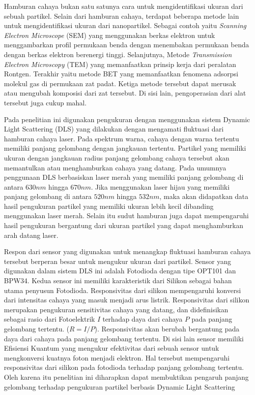 Hamburan cahaya bukan satu satunya cara untuk mengidentifikasi ukuran dari sebuah partikel. Selain
dari hamburan cahaya, terdapat beberapa metode lain untuk mengidentifikasi ukuran dari nanopartikel.
Sebagai contoh yaitu \textit{Scanning Electron Microscope} (SEM) yang menggunakan berkas elektron
untuk menggambarkan profil permukaan benda dengan menembakan permukaan benda dengan berkas elektron
berenergi tinggi. Selanjutnya, Metode \textit{Transmission Electron Microscopy} (TEM) yang
memanfaatkan prinsip kerja dari peralatan Rontgen. Terakhir yaitu metode BET yang memanfaatkan
fenomena adsorpsi molekul gas di permukaan zat padat. Ketiga metode tersebut dapat merusak atau
mengubah komposisi dari zat tersebut. Di sisi lain, pengoperasian dari alat tersebut juga cukup
mahal.

Pada penelitian ini digunakan pengukuran dengan menggunakan sistem Dynamic Light Scattering (DLS)
yang dilakukan dengan mengamati fluktuasi dari hamburan cahaya laser. Pada spektrum warna, cahaya
dengan warna tertentu memiliki panjang gelombang dengan jangkauan tertentu. Partikel yang memiliki
ukuran dengan jangkauan radius panjang gelombang cahaya tersebut akan memantulkan atau menghamburkan
cahaya yang datang. Pada umumnya penggunaan DLS berbasiskan laser merah yang memiliki panjang
gelombang di antara ${630 nm}$ hingga ${670 nm}$. Jika menggunakan laser hijau yang memiliki panjang
gelombang di antara ${520 nm}$ hingga ${532 nm}$, maka akan didapatkan data hasil pengukuran
partikel yang memiliki ukuran lebih kecil dibanding menggunakan laser merah\cite{Black1996}. Selain
itu sudut hamburan juga dapat mempengaruhi hasil pengukuran bergantung dari ukuran partikel yang
dapat menghamburkan arah datang laser\cite{DeVos2021}.

Respon dari sensor yang digunakan untuk menangkap fluktuasi hamburan cahaya tersebut berperan besar
untuk mengukur ukuran dari partikel. Sensor yang digunakan dalam sistem DLS ini adalah Fotodioda
dengan tipe OPT101 dan BPW34. Kedua sensor ini memiliki karakteristik dari Silikon sebagai bahan
utama penyusun Fotodioda. Responsivitas dari silikon mempengaruhi konversi dari intensitas cahaya
yang masuk menjadi arus listrik. Responsivitas dari silikon merupakan pengukuran sensitivitas cahaya
yang datang, dan didefinisikan sebagai rasio dari Fotoelektrik ${I}$ terhadap daya dari cahaya
${P}$ pada panjang gelombang tertentu. (${R = I/P}$). Responsivitas akan berubah bergantung pada
daya dari cahaya pada panjang gelombang tertentu. Di sisi lain sensor memiliki Efisiensi Kuantum
yang mengukur efektivitas dari sebuah sensor untuk mengkonversi kuatnya foton menjadi elektron.
Hal tersebut mempengaruhi responsivitas dari silikon pada fotodioda terhadap panjang gelombang
tertentu. Oleh karena itu penelitian ini diharapkan dapat membuktikan pengaruh panjang gelombang
terhadap pengukuran partikel berbasis Dynamic Light Scattering


